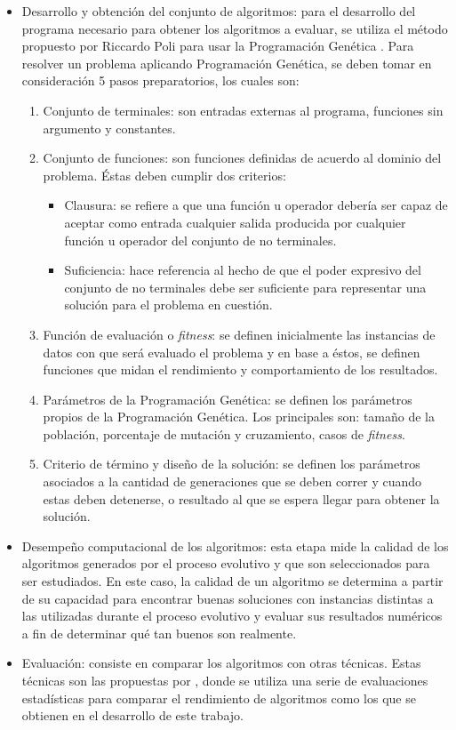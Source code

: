 \begin{itemize}
  \item Desarrollo y obtención del conjunto de algoritmos: para el desarrollo del programa necesario para obtener los algoritmos a evaluar, se utiliza el método propuesto por Riccardo Poli para usar la Programación Genética \cite{poli_2008}.
Para resolver un problema aplicando Programación Genética, se deben tomar en consideración 5 pasos preparatorios, los cuales son:
  \begin{enumerate}
    \item Conjunto de terminales: son entradas externas al programa, funciones sin argumento y constantes.
    \item Conjunto de funciones: son funciones definidas de acuerdo al dominio del problema. Éstas deben cumplir dos criterios:
    \begin{itemize}
      \item Clausura: se refiere a que una función u operador debería ser capaz de aceptar como entrada cualquier salida producida por cualquier función u operador del conjunto de no terminales.
      \item Suficiencia: hace referencia al hecho de que el poder expresivo del conjunto de no terminales debe ser suficiente para representar una solución para el problema en cuestión.
    \end{itemize}
    \item Función de evaluación o \textit{fitness}: se definen inicialmente las instancias de datos con que será evaluado el problema y en base a éstos, se definen funciones que midan el rendimiento y comportamiento de los resultados.
    \item Parámetros de la Programación Genética: se definen los parámetros propios de la Programación Genética. Los principales son: tamaño de la población, porcentaje de mutación y cruzamiento, casos de \textit{fitness}.
    \item Criterio de término y diseño de la solución: se definen los parámetros asociados a la cantidad de generaciones que se deben correr y cuando estas deben detenerse, o  resultado al que se espera llegar para obtener la solución.
  \end{enumerate}
  \item Desempeño computacional de los algoritmos: esta etapa mide la calidad de los algoritmos generados por el proceso evolutivo y que son seleccionados para ser estudiados. En este caso, la calidad de un algoritmo se determina a partir de su capacidad para encontrar buenas soluciones con instancias distintas a las utilizadas durante el proceso evolutivo y evaluar sus resultados numéricos a fin de determinar qué tan buenos son realmente.

  \item Evaluación: consiste en comparar los algoritmos con otras técnicas. Estas técnicas son las propuestas por \cite{derrac_2011}, donde se utiliza una serie de evaluaciones estadísticas para comparar el rendimiento de algoritmos como los que se obtienen en el desarrollo de este trabajo.
\end{itemize}

